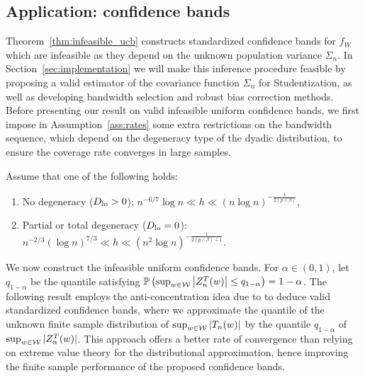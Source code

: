 \subsection{Application: confidence bands}

Theorem~\ref{thm:infeasible_ucb} constructs standardized confidence bands for
$f_W$ which are infeasible as they depend on the unknown population variance
$\Sigma_n$. In Section~\ref{sec:implementation} we will make this inference
procedure feasible by proposing a valid estimator of the covariance function
$\Sigma_n$ for Studentization, as well as developing bandwidth selection and
robust bias correction methods. Before presenting our result on valid
infeasible uniform confidence bands, we first impose in
Assumption~\ref{ass:rates} some extra restrictions on the bandwidth sequence,
which depend on the degeneracy type of the dyadic distribution, to ensure the
coverage rate converges in large samples.

\begin{assumption}
  \label{ass:rates}
  Assume that one of the following holds:
  \begin{enumerate}[label=(\roman*)]

    \item
      \label{it:rate_non}
      No degeneracy ($D_{\textup{lo}} > 0$):
      $n^{-6/7} \log n \ll h \ll (n \log n)^{-\frac{1}{2(p \wedge \beta)}}$,

    \item
      \label{it:rate_degen}
      Partial or total degeneracy ($D_{\textup{lo}} = 0$):
      $n^{-2/3} (\log n)^{7/3} \ll h
      \ll (n^2 \log n)^{-\frac{1}{2(p \wedge \beta) + 1}}$.
  \end{enumerate}
\end{assumption}

We now construct the infeasible uniform confidence bands.
For $\alpha \in (0,1)$, let $q_{1-\alpha}$ be the quantile satisfying
$ \mathbb{P}\left(\sup_{w \in \mathcal{W}} \left| Z_n^T(w) \right| \leq q_{1-\alpha} \right)
= 1 - \alpha$.
The following result employs the anti-concentration idea due to
\citet{chernozhukov2014anti} to deduce valid standardized confidence bands,
where we approximate the quantile of the unknown finite sample distribution of
$\sup_{w\in\mathcal{W}} |T_n(w)|$ by the quantile $q_{1-\alpha}$ of
$\sup_{w\in\mathcal{W}}|Z_n^T(w)|$. This approach offers a better rate of convergence
than relying on extreme value theory for the distributional approximation,
hence improving the finite sample performance of the proposed confidence bands.

